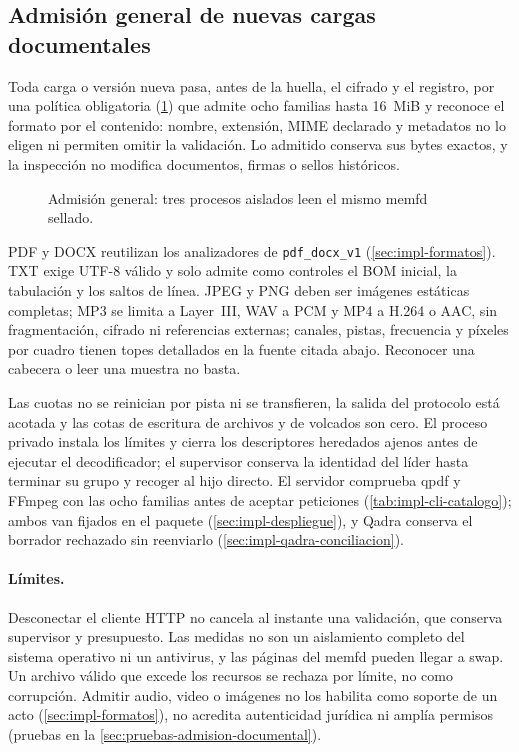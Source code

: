 \subsection{Admisión general de nuevas cargas documentales}\label{sec:impl-admision-documental}

Toda carga o versión nueva pasa, antes de la huella, el cifrado y el registro, por una política obligatoria (\cref{fig:impl-doc-admision}) que admite ocho familias hasta 16~MiB y reconoce el formato por el contenido: nombre, extensión, MIME declarado y metadatos no lo eligen ni permiten omitir la validación. Lo admitido conserva sus bytes exactos, y la inspección no modifica documentos, firmas o sellos históricos.

\begin{figure}[t]
  \centering
  
  \caption{Admisión general: tres procesos aislados leen el mismo memfd sellado.}
  \label{fig:impl-doc-admision}
\end{figure}

PDF y DOCX reutilizan los analizadores de \texttt{pdf\_docx\_v1} (\cref{sec:impl-formatos}). TXT exige UTF-8 válido y solo admite como controles el BOM inicial, la tabulación y los saltos de línea. JPEG y PNG deben ser imágenes estáticas completas; MP3 se limita a Layer~III, WAV a PCM y MP4 a H.264 o AAC, sin fragmentación, cifrado ni referencias externas; canales, pistas, frecuencia y píxeles por cuadro tienen topes detallados en la fuente citada abajo. Reconocer una cabecera o leer una muestra no basta.

Las cuotas no se reinician por pista ni se transfieren, la salida del protocolo está acotada y las cotas de escritura de archivos y de volcados son cero. El proceso privado instala los límites y cierra los descriptores heredados ajenos antes de ejecutar el decodificador; el supervisor conserva la identidad del líder hasta terminar su grupo y recoger al hijo directo. El servidor comprueba qpdf y FFmpeg con las ocho familias antes de aceptar peticiones (\cref{tab:impl-cli-catalogo}); ambos van fijados en el paquete (\cref{sec:impl-despliegue}), y Qadra conserva el borrador rechazado sin reenviarlo (\cref{sec:impl-qadra-conciliacion}).

\paragraph{Límites.} Desconectar el cliente HTTP no cancela al instante una validación, que conserva supervisor y presupuesto. Las medidas no son un aislamiento completo del sistema operativo ni un antivirus, y las páginas del memfd pueden llegar a swap. Un archivo válido que excede los recursos se rechaza por límite, no como corrupción. Admitir audio, video o imágenes no los habilita como soporte de un acto (\cref{sec:impl-formatos}), no acredita autenticidad jurídica ni amplía permisos (pruebas en la \cref{sec:pruebas-admision-documental}).

